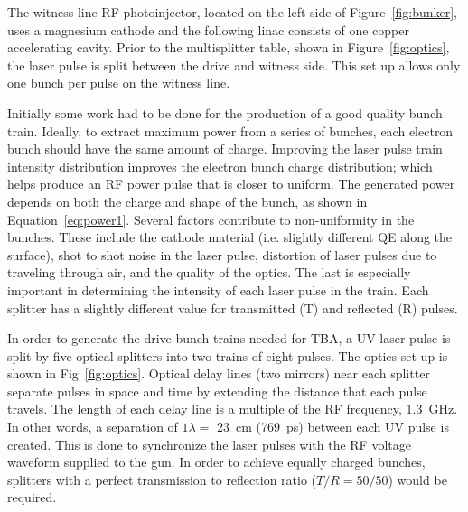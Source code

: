 The witness line RF photoinjector, located on the left side of Figure~\ref{fig:bunker}, 
uses a magnesium cathode and the following linac consists of one copper
accelerating cavity. Prior to the multisplitter table, shown in
Figure~\ref{fig:optics}, the laser pulse is split between the drive and witness side.
This set up allows only one bunch per pulse on the witness line. 

\label{sec:uvoptics}

Initially some work had to be done for the production of a good quality  bunch train. Ideally, to extract maximum power from a series of bunches, each electron bunch should have the same amount of charge.  Improving the laser pulse train intensity distribution improves the electron bunch charge distribution; 
which  helps produce an RF power pulse that is closer to uniform. 
The generated power depends on both the charge and shape of the bunch, as shown in Equation~\ref{eq:power1}. 
Several factors contribute to non-uniformity in the bunches. These include the cathode material
(i.e. slightly different QE along the surface), shot to shot noise in the laser pulse, 
distortion of laser pulses due to traveling through air, and the quality of the optics. 
The last is especially important in determining the intensity of each laser pulse in the train.  
Each splitter has a slightly different value for transmitted (T) and reflected (R) pulses. 

In order to generate the drive bunch trains needed for TBA, a UV laser pulse is split 
by five optical splitters into two trains of eight pulses. 
The optics set up is shown in Fig~\ref{fig:optics}. Optical delay lines (two mirrors) near each splitter 
separate pulses in space and time by extending the distance that each pulse travels. 
The length of each delay line is a multiple of the RF frequency, \SI{1.3}{GHz}. 
In other words, a separation of $1\lambda=$ \SI{23}{cm} (\SI{769}{ps}) between each UV pulse is created. 
This is done to synchronize the laser pulses with the RF voltage waveform supplied to the gun.
In order to achieve equally charged bunches, splitters with a perfect transmission 
to reflection ratio ($T/R = 50/50$) would be required.

